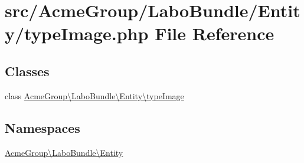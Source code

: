 \hypertarget{type_image_8php}{\section{src/\+Acme\+Group/\+Labo\+Bundle/\+Entity/type\+Image.php File Reference}
\label{type_image_8php}
}
\subsection*{Classes}
\begin{DoxyCompactItemize}
\item 
class \hyperlink{class_acme_group_1_1_labo_bundle_1_1_entity_1_1type_image}{Acme\+Group\textbackslash{}\+Labo\+Bundle\textbackslash{}\+Entity\textbackslash{}type\+Image}
\end{DoxyCompactItemize}
\subsection*{Namespaces}
\begin{DoxyCompactItemize}
\item 
 \hyperlink{namespace_acme_group_1_1_labo_bundle_1_1_entity}{Acme\+Group\textbackslash{}\+Labo\+Bundle\textbackslash{}\+Entity}
\end{DoxyCompactItemize}
